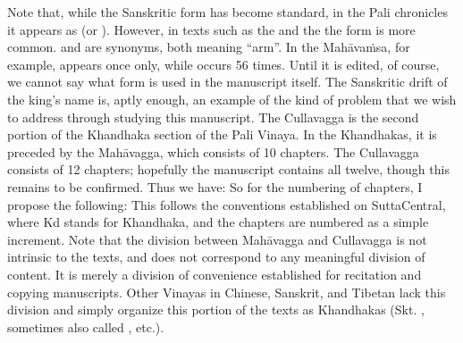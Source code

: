 {}Note that, while the Sanskritic form  has become standard, in the Pali chronicles it appears as  (or ). However, in texts such as the  and the  the form  is more common.  and  are synonyms, both meaning “arm”. In the Mahāvaṁsa, for example,  appears once only, while  occurs 56 times. Until it is edited, of course, we cannot say what form is used in the manuscript itself. The Sanskritic drift of the king’s name is, aptly enough, an example of the kind of problem that we wish to address through studying this manuscript.\markdownRendererInterblockSeparator
{}\markdownRendererInterblockSeparator
{}The Cullavagga is the second portion of the Khandhaka section of the Pali Vinaya. In the Khandhakas, it is preceded by the Mahāvagga, which consists of 10 chapters. The Cullavagga consists of 12 chapters; hopefully the manuscript contains all twelve, though this remains to be confirmed.\markdownRendererInterblockSeparator
{}Thus we have:\markdownRendererInterblockSeparator
{}\markdownRendererInterblockSeparator
{}So for the numbering of chapters, I propose the following:\markdownRendererInterblockSeparator
{}\markdownRendererBlockQuoteBegin
{}
\markdownRendererBlockQuoteEnd \markdownRendererInterblockSeparator
{}This follows the conventions established on SuttaCentral, where Kd stands for Khandhaka, and the chapters are numbered as a simple increment.\markdownRendererInterblockSeparator
{}Note that the division between Mahāvagga and Cullavagga is not intrinsic to the texts, and does not correspond to any meaningful division of content. It is merely a division of convenience established for recitation and copying manuscripts. Other Vinayas in Chinese, Sanskrit, and Tibetan lack this division and simply organize this portion of the texts as Khandhakas (Skt. , sometimes also called , etc.).\markdownRendererInterblockSeparator
